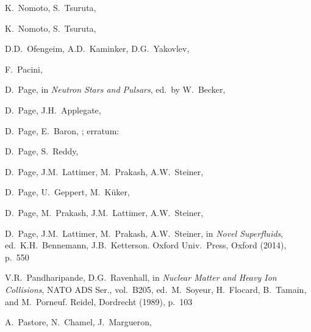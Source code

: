 \documentclass[smallextended]{svjour3}       %
\begin{document}
\begin{thebibliography}{}
K.~Nomoto, S.~Tsuruta,

K.~Nomoto, S.~Tsuruta,

D.D.~Ofengeim, A.D.~Kaminker, D.G.~Yakovlev,

F.~Pacini,

D.~Page,
in \textit{Neutron Stars and Pulsars},
ed.~by W.~Becker,

D.~Page, J.H.~Applegate,

D.~Page, E.~Baron,
;
erratum: 

D.~Page, S.~Reddy,

 D.~Page, J.M.~Lattimer, M.~Prakash, A.W.~Steiner,

D.~Page, U.~Geppert, M.~K\"uker,

D.~Page, M.~Prakash, J.M.~Lattimer, A.W.~Steiner,

D.~Page, J.M.~Lattimer, M.~Prakash, A.W.~Steiner,
in \textit{Novel Superfluids},
ed.~K.H.~Bennemann, J.B.~Ketterson.
Oxford Univ.\ Press, Oxford (2014), p.~550%

V.R.~Pandharipande, D.G.~Ravenhall,
in \textit{Nuclear Matter and Heavy Ion Collisions},
NATO ADS Ser., vol.~B205, 
ed.~M.~Soyeur, H.~Flocard, B.~Tamain, and M.~Porneuf.
Reidel, Dordrecht (1989), p.~103

A.~Pastore, N.~Chamel, J.~Margueron,


\end{thebibliography}
\end{document}
